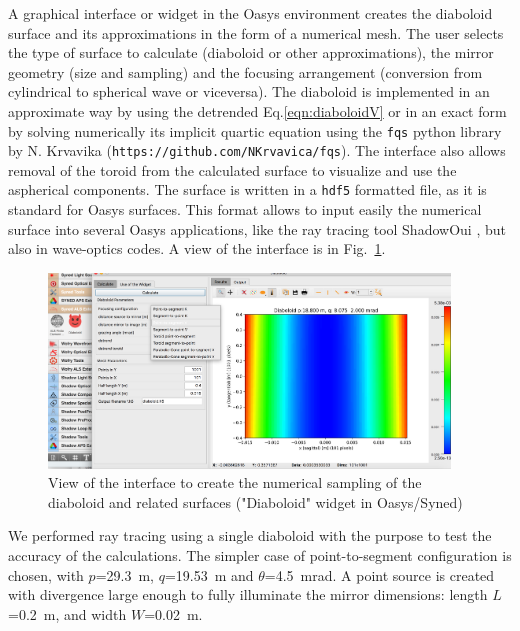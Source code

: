 \documentclass{iucr}              %
\begin{document}
A graphical interface or widget in the Oasys environment  creates the diaboloid surface and its approximations in the form of a numerical mesh. The user selects the type of surface to calculate (diaboloid or other approximations), the mirror geometry (size and sampling) and the focusing arrangement (conversion from cylindrical to spherical wave or viceversa). 
The diaboloid is implemented in an approximate way by using the detrended Eq.\ref{eqn:diaboloidV} or in an exact form by solving numerically its implicit quartic equation using the {\tt fqs} python library by N. Krvavika ({\tt https://github.com/NKrvavica/fqs}). 
The interface also allows removal of the toroid from the calculated surface to visualize and use the aspherical components. The surface is written in a {\tt hdf5} formatted file, as it is standard for Oasys surfaces. This format allows to input easily the numerical surface into several Oasys applications, like the ray tracing tool ShadowOui \cite{codeSHADOWOUI}, but also in wave-optics codes. A view of the interface is in Fig.~\ref{fig:widget}.

\begin{figure}\label{fig:widget}
\centering
\includegraphics[width=0.95\textwidth]{figures/widget.png}
\caption{View of the interface to create the numerical sampling of the diaboloid and related surfaces ("Diaboloid" widget in Oasys/Syned) }
\end{figure}


We performed ray tracing using a single diaboloid with the purpose to test the accuracy of the calculations. The simpler case of point-to-segment configuration is chosen, with $p$=29.3~m, $q$=19.53~m and $\theta$=4.5~mrad. A point source is created with divergence large enough to fully illuminate the mirror dimensions: length $L$=0.2~m, and width $W$=0.02~m.
\end{document}
